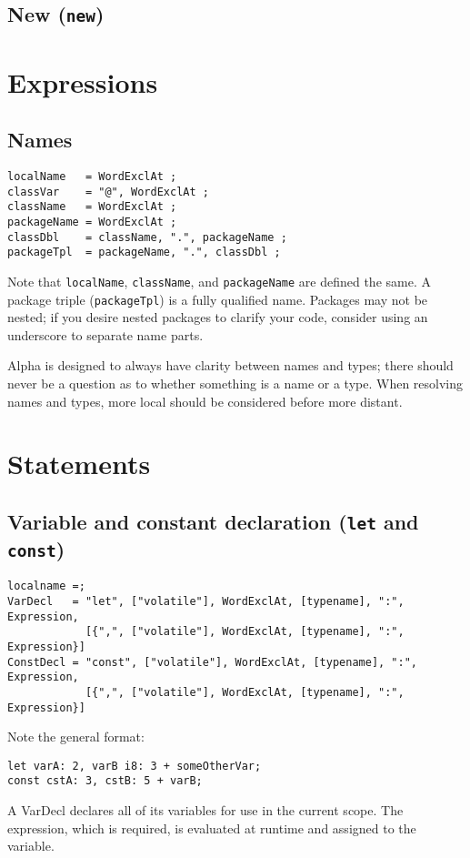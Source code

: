 \documentclass{article}
\begin{document}
\subsection{New (\texttt{new})}
\label{sub:operators:new}

\section{Expressions}
\label{sec:expressions}

\subsection{Names}
\label{sub:expressions:names}
\begin{verbatim}
localName   = WordExclAt ;
classVar    = "@", WordExclAt ;
className   = WordExclAt ;
packageName = WordExclAt ;
classDbl    = className, ".", packageName ;
packageTpl  = packageName, ".", classDbl ;
\end{verbatim}

Note that \texttt{localName}, \texttt{className}, and \texttt{packageName} are
defined the same. A package triple (\texttt{packageTpl}) is a fully qualified
name. Packages may not be nested; if you desire nested packages to clarify your
code, consider using an underscore to separate name parts.

Alpha is designed to always have clarity between names and types; there should
never be a question as to whether something is a name or a type. When resolving
names and types, more local should be considered before more distant.

\section{Statements}
\label{sec:statements}

\subsection{Variable and constant declaration (\texttt{let} and \texttt{const})}
\label{sub:statements:vardecl}
\begin{verbatim}
localname =;
VarDecl   = "let", ["volatile"], WordExclAt, [typename], ":", Expression,
            [{",", ["volatile"], WordExclAt, [typename], ":", Expression}]
ConstDecl = "const", ["volatile"], WordExclAt, [typename], ":", Expression,
            [{",", ["volatile"], WordExclAt, [typename], ":", Expression}]
\end{verbatim}
Note the general format:
\begin{verbatim}
let varA: 2, varB i8: 3 + someOtherVar;
const cstA: 3, cstB: 5 + varB;
\end{verbatim}
A VarDecl declares all of its variables for use in the current scope. The
expression, which is required, is evaluated at runtime and assigned to the
variable.
\end{document}
